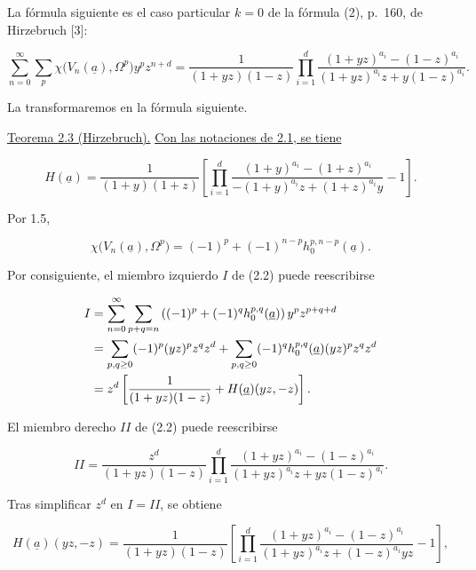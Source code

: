 La fórmula siguiente es el caso particular $k=0$ de la fórmula (2),
p.~160, de Hirzebruch [3]:

\pageoriginale

\begin{equation}\tag{2.2}
\sum_{n=0}^{\infty}\sum_p
\chi\bigl(V_n(\underline a),\Omega^p\bigr)y^pz^{n+d}
=\frac{1}{(1+yz)(1-z)}
\prod_{i=1}^d
\frac{(1+yz)^{a_i}-(1-z)^{a_i}}
{(1+yz)^{a_i}z+y(1-z)^{a_i}}.
\end{equation}

La transformaremos en la fórmula siguiente.

\medskip
\noindent\underline{Teorema 2.3 (Hirzebruch).}\quad
\underline{Con las notaciones de 2.1, se tiene}

\begin{equation*}
H(\underline a)=\frac{1}{(1+y)(1+z)}\left[
\prod_{i=1}^d
\frac{(1+y)^{a_i}-(1+z)^{a_i}}
{-(1+y)^{a_i}z+(1+z)^{a_i}y}-1\right].
\end{equation*}

Por 1.5,

\begin{equation*}
\chi\bigl(V_n(\underline a),\Omega^p\bigr)
=(-1)^p+(-1)^{n-p}h_0^{p,n-p}(\underline a).
\end{equation*}

Por consiguiente, el miembro izquierdo $I$ de (2.2) puede reescribirse

\begin{align*}
I
&=\sum_{n=0}^{\infty}\sum_{p+q=n}
\left((-1)^p+(-1)^q h_0^{p,q}(\underline a)\right)y^pz^{p+q+d}\\
&=\sum_{p,q\geq0}(-1)^p(yz)^p\sisi{z.^q}{z^q}z^d
+\sum_{p,q\geq0}(-1)^q h_0^{p,q}(\underline a)(yz)^p\sisi{z.^q}{z^q}z^d\\
&=z^d\left[\frac{1}{(1+yz)(1-z)}
+H(\underline a)(yz,-z)\right].
\end{align*}

El miembro derecho $II$ de (2.2) puede reescribirse

\begin{equation*}
II=\frac{z^d}{(1+yz)(1-z)}
\prod_{i=1}^d
\frac{(1+yz)^{a_i}-(1-z)^{a_i}}
{(1+yz)^{a_i}z+yz(1-z)^{a_i}}.
\end{equation*}

Tras simplificar $z^d$ en $I=II$, se obtiene

\begin{equation*}
H(\underline a)(yz,-z)
=\frac{1}{(1+yz)(1-z)}\left[
\prod_{i=1}^d
\frac{(1+yz)^{a_i}-(1-z)^{a_i}}
{(1+yz)^{a_i}z+(1-z)^{a_i}yz}-1\right],
\end{equation*}

